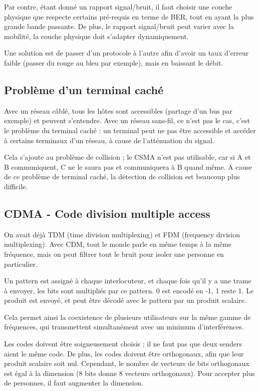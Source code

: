 	Par contre, étant donné un rapport signal/bruit, il faut choisir une couche physique que respecte certains pré-requis en terme de BER, tout en ayant la plus grande bande passante. De plus, le rapport signal/bruit peut varier avec la mobilité, la couche physique doit s'adapter dynamiquement.
	
	Une solution est de passer d'un protocole à l'autre afin d'avoir un taux d'erreur faible (passer du rouge au bleu par exemple), mais en baissant le débit.
	
		\subsection{Problème d'un terminal caché}
		
	
		Avec un réseau câblé, tous les hôtes sont accessibles (partage d'un bus par exemple) et peuvent s'entendre. Avec un réseau sans-fil, ce n'est pas le cas, c'est le problème du terminal caché : un terminal peut ne pas être accessible et accéder à certains terminaux d'un réseau, à cause de l'atténuation du signal.
	
		Cela s'ajoute au problème de collision ; le CSMA n'est pas utilisable, car si A et B communiquent, C ne le saura pas et communiquera à B quand même. A cause de ce problème de terminal caché, la détection de collision est beaucoup plus difficile.
		
		
		\subsection{CDMA - Code division multiple access}
		
		On avait déjà TDM (time division multiplexing) et FDM (frequency division multiplexing). Avec CDM, tout le monde parle en même temps à la même fréquence, mais on peut filtrer tout le bruit pour isoler une personne en particulier.
		
		Un pattern est assigné à chaque interlocuteur, et chaque fois qu'il y a une trame à envoyer, les bits sont multipliés par ce pattern. 0 est encodé en -1, 1 reste 1. Le produit est envoyé, et peut être décodé avec le pattern par un produit scalaire.
		
		
		Cela permet ainsi la coexistence de plusieurs utilisateurs sur la même gamme de fréquences, qui transmettent simultanément avec un minimum d'interférences.
		
		Les codes doivent être soigneusement choisis ; il ne faut pas que deux senders aient le même code. De plus, les codes doivent être orthogonaux, afin que leur produit scalaire soit nul. Cependant, le nombre de vecteurs de bits orthogonaux est égal à la dimension (8 bits donne 8 vecteurs orthogonaux). Pour accepter plus de personnes, il faut augmenter la dimension.
		
